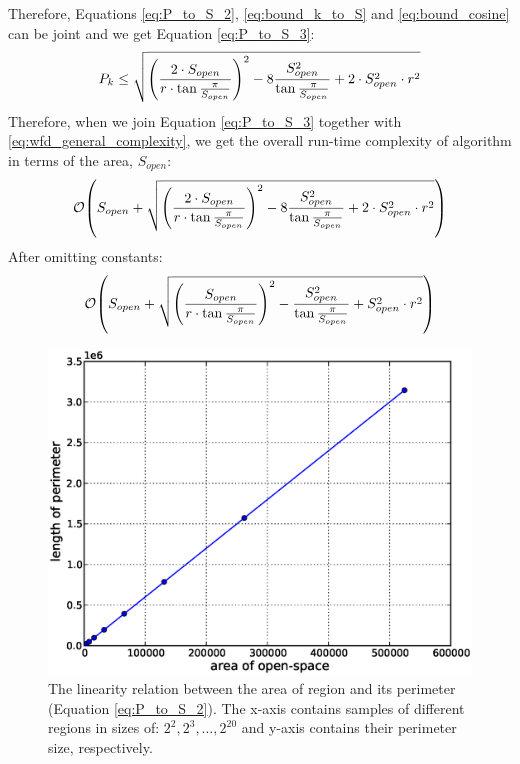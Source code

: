  Therefore, Equations \eqref{eq:P_to_S_2},
 \eqref{eq:bound_k_to_S} and \eqref{eq:bound_cosine} can be joint and we get
 Equation \eqref{eq:P_to_S_3}:
\begin{equation}\label{eq:P_to_S_3}
P_k \le \sqrt{{\left(\frac{2\cdot S_{open}}{r\cdot\tan{\frac{\pi}{S_{open}}}}\right)}^2
	       -8\frac{S_{open}^2}{\tan{\frac{\pi}{S_{open}}}}
	       + 2\cdot S_{open}^2\cdot r^2}
\end{equation}
Therefore, when we join Equation
\eqref{eq:P_to_S_3} together with \eqref{eq:wfd_general_complexity}, we get the
overall run-time complexity of \WFD algorithm in terms of the \openspace area,
$S_{open}$:
\begin{equation*}
\mathcal{O}{\left(S_{open} +
\sqrt{{\left(\frac{2\cdot
S_{open}}{r\cdot\tan{\frac{\pi}{S_{open}}}}\right)}^2
-8\frac{S_{open}^2}{\tan{\frac{\pi}{S_{open}}}} + 2\cdot S_{open}^2\cdot r^2
	 }
\right)}
\end{equation*}
After omitting constants:
\begin{equation}\label{eq:wfd_final_complexity}
\mathcal{O}{\left(S_{open} +
\sqrt{{\left(\frac{
S_{open}}{r\cdot\tan{\frac{\pi}{S_{open}}}}\right)}^2
-\frac{S_{open}^2}{\tan{\frac{\pi}{S_{open}}}} + S_{open}^2\cdot r^2
	 }
\right)}
\end{equation}


\begin{figure}
\centering
\includegraphics[width=0.6\columnwidth,keepaspectratio]{images/perimeter_graph.eps}
\caption{The linearity relation between the area of \openspace region
and its perimeter (Equation \eqref{eq:P_to_S_2}). The x-axis contains samples of
different \openspace regions in sizes of: $2^2,2^3,\ldots,2^{20}$ and y-axis contains their perimeter size,
respectively.}
\label{fig:linearity_of_perimeter_length}
\end{figure}


